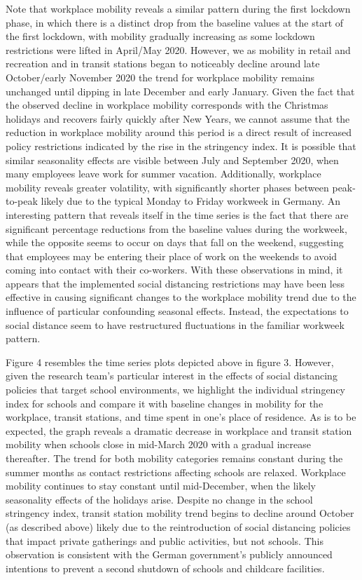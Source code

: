 Note that workplace mobility reveals a similar pattern during the first lockdown phase, in which there is a distinct drop from the baseline values at the start of the first lockdown, with mobility gradually increasing as some lockdown restrictions were lifted in April/May 2020. However, we as mobility in retail and recreation and in transit stations began to noticeably decline around late October/early November 2020 the trend for workplace mobility remains unchanged until dipping in late December and early January. Given the fact that the observed decline in workplace mobility corresponds with the Christmas holidays and recovers fairly quickly after New Years, we cannot assume that the reduction in workplace mobility around this period is a direct result of increased policy restrictions indicated by the rise in the stringency index. It is possible that similar seasonality effects are visible between July and September 2020, when many employees leave work for summer vacation. Additionally, workplace mobility reveals greater volatility, with significantly shorter phases between peak-to-peak likely due to the typical Monday to Friday workweek in Germany. An interesting pattern that reveals itself in the time series is the fact that there are significant percentage reductions from the baseline values during the workweek, while the opposite seems to occur on days that fall on the weekend, suggesting that employees may be entering their place of work on the weekends to avoid coming into contact with their co-workers. With these observations in mind, it appears that the implemented social distancing restrictions may have been less effective in causing significant changes to the workplace mobility trend due to the influence of particular confounding seasonal effects. Instead, the expectations to social distance seem to have restructured fluctuations in the familiar workweek pattern. 

Figure 4 resembles the time series plots depicted above in figure 3. However, given the research team’s particular interest in the effects of social distancing policies that target school environments, we highlight the individual stringency index for schools and compare it with baseline changes in mobility for the workplace, transit stations, and time spent in one’s place of residence. As is to be expected, the graph reveals a dramatic decrease in workplace and transit station mobility when schools close in mid-March 2020 with a gradual increase thereafter. The trend for both mobility categories remains constant during the summer months as contact restrictions affecting schools are relaxed. Workplace mobility continues to stay constant until mid-December, when the likely seasonality effects of the holidays arise. Despite no change in the school stringency index, transit station mobility trend begins to decline around October (as described above) likely due to the reintroduction of social distancing policies that impact private gatherings and public activities, but not schools. This observation is consistent with the German government’s publicly announced intentions to prevent a second shutdown of schools and childcare facilities. 

